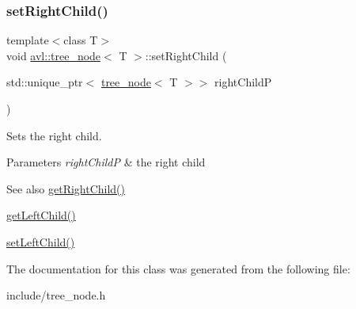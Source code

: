 \subsubsection{\texorpdfstring{set\+Right\+Child()}{setRightChild()}}
{\footnotesize\ttfamily template$<$class T$>$ \\
void \hyperlink{classavl_1_1tree__node}{avl\+::tree\+\_\+node}$<$ T $>$\+::set\+Right\+Child (\begin{DoxyParamCaption}\item[{std\+::unique\+\_\+ptr$<$ \hyperlink{classavl_1_1tree__node}{tree\+\_\+node}$<$ T $>$$>$}]{right\+ChildP }\end{DoxyParamCaption})\hspace{0.3cm}{\ttfamily [inline]}}

Sets the right child. 
\begin{DoxyParams}{Parameters}
{\em right\+ChildP} & the right child \\
\hline
\end{DoxyParams}
\begin{DoxySeeAlso}{See also}
\hyperlink{classavl_1_1tree__node_ac79592e64351573e622d0977002fc813}{get\+Right\+Child()} 

\hyperlink{classavl_1_1tree__node_ad12a5f6a41cfc6203913c5b6bce30837}{get\+Left\+Child()} 

\hyperlink{classavl_1_1tree__node_a21990bf288cf0ec0572e53afbacb9b35}{set\+Left\+Child()} 
\end{DoxySeeAlso}


The documentation for this class was generated from the following file\+:\begin{DoxyCompactItemize}
\item 
include/tree\+\_\+node.\+h\end{DoxyCompactItemize}
